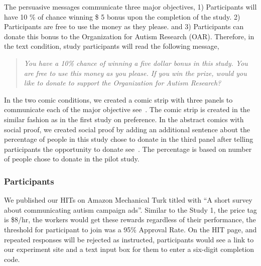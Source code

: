 The persuasive messages communicate three major objectives, 1) Participants will have 10 \% of chance winning \$ 5 bonus upon the completion of the study. 2) Participants are free to use the money as they please. and 3) Participants can donate this bonus to the Organization for Autism Research (OAR). Therefore, in the text condition, study participants will read the following message,
\begin{quote}
  \textit{You have a 10\% chance of winning a five dollar bonus in this study. You are free to use this money as you please. If you win the prize, would you like to donate to support the Organization for Autism Research?}
\end{quote}
In the two comic conditions, we created a comic strip with three panels to communicate each of the major objective see~. The comic strip is created in the similar fashion as in the first study on preference. In the abstract comics with social proof, we created social proof by adding an additional sentence about the percentage of people in this study chose to donate in the third panel after telling participants the opportunity to donate see~. The percentage is based on number of people chose to donate in the pilot study.






\subsubsection{Participants}
We published our HITs on Amazon Mechanical Turk titled with ``A short survey about communicating autism campaign ads''. Similar to the Study 1, the price tag is \$8/hr, the workers would get these rewards regardless of their performance, the threshold for participant to join was a 95\% Approval Rate. On the HIT page, and repeated responses will be rejected as instructed, participants would see a link to our experiment site and a text input box for them to enter a six-digit completion code.
